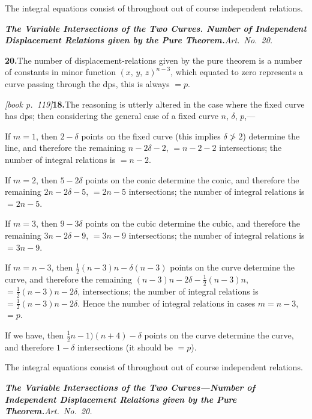 \documentclass[11pt,a4paper]{article}
\theoremstyle{plain}
\theoremstyle{definition}
\theoremstyle{remark}
\begin{document}
The integral equations consist of throughout out of course independent relations.

\medskip\noindent\textit{\textbf{The Variable Intersections of the Two Curves. Number of Independent Displacement Relations given by the Pure Theorem.}\quad Art.\ No.\ 20.}

\medskip\noindent\textbf{20.}\quad The number of displacement-relations given by the pure theorem is a number of constants in minor function $(x,\,y,\,z)^{n-3}$, which equated to zero represents a curve passing through the dps, this is always $= p$.

\noindent\textit{[book p.~119]}\quad \textbf{18.}\quad The reasoning is utterly altered in the case where the fixed curve has dps; then considering the general case of a fixed curve $n$, $\delta$, $p$,---

If $m = 1$, then $2 - \delta$ points on the fixed curve (this implies $\delta \not> 2$) determine the line, and therefore the remaining $n - 2\delta - 2$, $= n - 2 - 2$ intersections; the number of integral relations is $= n - 2$.

If $m = 2$, then $5 - 2\delta$ points on the conic determine the conic, and therefore the remaining $2n - 2\delta - 5$, $= 2n - 5$ intersections; the number of integral relations is $= 2n - 5$.

If $m = 3$, then $9 - 3\delta$ points on the cubic determine the cubic, and therefore the remaining $3n - 2\delta - 9$, $= 3n - 9$ intersections; the number of integral relations is $= 3n - 9$.

If $m = n - 3$, then $\tfrac{1}{2}(n - 3)n - \delta(n - 3)$ points on the curve determine the curve, and therefore the remaining $(n - 3)n - 2\delta - \tfrac{1}{2}(n - 3)n$, $= \tfrac{1}{2}(n - 3)n - 2\delta$, intersections; the number of integral relations is $= \tfrac{1}{2}(n - 3)n - 2\delta$. Hence the number of integral relations in cases $m = n - 3$, $= p$.

If we have, then $\tfrac{1}{2}n - 1)(n + 4) - \delta$ points on the curve determine the curve, and therefore $1 - \delta$ intersections (it should be $= p$).

The integral equations consist of throughout out of course independent relations.

\medskip\noindent\textit{\textbf{The Variable Intersections of the Two Curves---Number of Independent Displacement Relations given by the Pure Theorem.}\quad Art.\ No.~20.}
\end{document}
